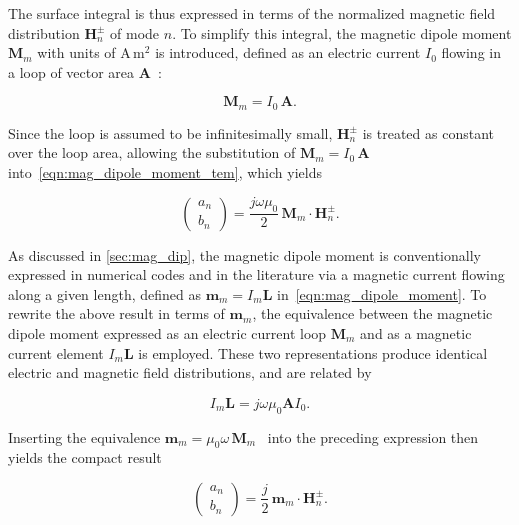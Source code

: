 The surface integral is thus expressed in terms of the normalized magnetic field
distribution $\mathbf{H}_n^\pm$ of mode $n$. To simplify this integral, the magnetic
dipole moment $\mathbf{M}_m$ with units of
$\mathrm{A\,m^2}$ is introduced, defined as an electric current $I_0$
flowing in a loop of vector area $\mathbf{A}$~\cite[p.~361]{Collin_2015}:

\begin{equation}
	\mathbf{M}_m = I_0\,\mathbf{A}.
	\label{eqn:M_m}
\end{equation}

Since the loop is assumed to be
infinitesimally small, $\mathbf{H}_n^\pm$ is treated as constant over the loop area,
allowing the substitution of $\mathbf{M}_m = I_0\,\mathbf{A}$
into~\eqref{eqn:mag_dipole_moment_tem}, which yields

\begin{equation}
	\begin{pmatrix}a_n \\ b_n\end{pmatrix}
	= \frac{j\omega\mu_0}{2}\,\mathbf{M}_m\cdot\mathbf{H}_n^\pm.
\end{equation}

As discussed in \cref{sec:mag_dip}, the magnetic dipole moment is conventionally
expressed in numerical codes and in the literature via a magnetic current flowing
along a given length, defined as $\mathbf{m}_m = I_m\mathbf{L}$
in~\eqref{eqn:mag_dipole_moment}. To rewrite the above result in terms of
$\mathbf{m}_m$, the equivalence between the magnetic dipole moment expressed as an
electric current loop $\mathbf{M}_m$ and as a magnetic current element $I_m\mathbf{L}$
is employed. These two representations produce identical electric and magnetic field
distributions, and are related by~\cite[p.~237]{Balanis_1997}

\begin{equation}
	I_m \mathbf{L} = j\omega\mu_0 \mathbf{A} I_0.
	\label{eqn:magn_current_curr_loop}
\end{equation}

Inserting the equivalence
$\mathbf{m}_m = \mu_0\omega\,\mathbf{M}_m$~\cite{Kreindl_Bauernfeind_Weiss_Stockreiter_Kaltenbacher_2024}
into the preceding expression then yields the compact result

\begin{equation}
	\begin{pmatrix}a_n \\ b_n\end{pmatrix} = \frac{j}{2}\,\mathbf{m}_m\cdot\mathbf{H}_n^\pm.
	\label{eqn:a_b_moments_mag}
\end{equation}

